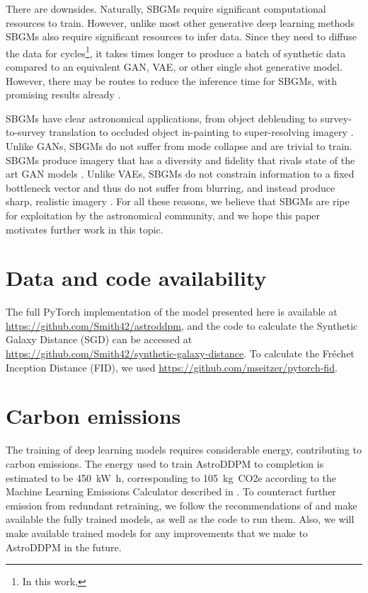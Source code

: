 \documentclass[fleqn,usenatbib]{mnras}
\begin{document}
There are downsides. Naturally, SBGMs require significant computational
resources to train. However, unlike most other generative deep learning methods
SBGMs also require significant resources to infer data. Since they need to
diffuse the data for  cycles\footnote{In this work, }, it takes
 times longer to produce a batch of synthetic data compared to an equivalent
GAN, VAE, or other single shot generative model. However, there may be routes
to reduce the inference time for SBGMs, with promising results already
\citep{cite_ajm2021,cite_song2021}.

SBGMs have clear astronomical applications, from object deblending
\citep{cite_jayaram2020} to survey-to-survey translation
\citep{cite_sasaki2021} to occluded object in-painting
\citep{cite_kadkhodaie2020,cite_song2021} to super-resolving imagery
\citep{cite_saharia2021}. Unlike GANs, SBGMs do not suffer from mode collapse
and are trivial to train.  SBGMs produce imagery that has a
diversity and fidelity that rivals state of the art GAN models
\citep{cite_song2021,cite_nichol2021,cite_dhariwal2021}. Unlike VAEs,
SBGMs do not constrain information to a fixed bottleneck vector and
thus do not suffer from blurring, and instead produce sharp, realistic imagery
\citep{cite_spindler2021}. For all these reasons, we believe that SBGMs 
are ripe for exploitation by the astronomical community, and we hope 
this paper motivates further work in this topic. 

\section*{Data and code availability}
  
The full PyTorch \citep{cite_pytorch} implementation of the model presented
here is available at \url{https://github.com/Smith42/astroddpm}, and the code
to calculate the Synthetic Galaxy Distance (SGD) can be accessed at
\url{https://github.com/Smith42/synthetic-galaxy-distance}. To calculate the
Fr\'echet Inception Distance (FID), we used
\url{https://github.com/mseitzer/pytorch-fid}.  

\section*{Carbon emissions}

The training of deep learning models requires considerable energy, contributing
to carbon emissions. The energy used to train AstroDDPM to completion is
estimated to be \SI{450}{\kilo\watt\hour}, corresponding to
\SI{105}{\kilo\gram.CO2e} according to the Machine Learning Emissions
Calculator described in \citet{cite_lacoste2019}.  To counteract further
emission from redundant retraining, we follow the recommendations of
\citet{cite_strubell2019} and make available the fully trained models, as well
as the code to run them. Also, we will make available trained models for any
improvements that we make to AstroDDPM in the future.
\end{document}
